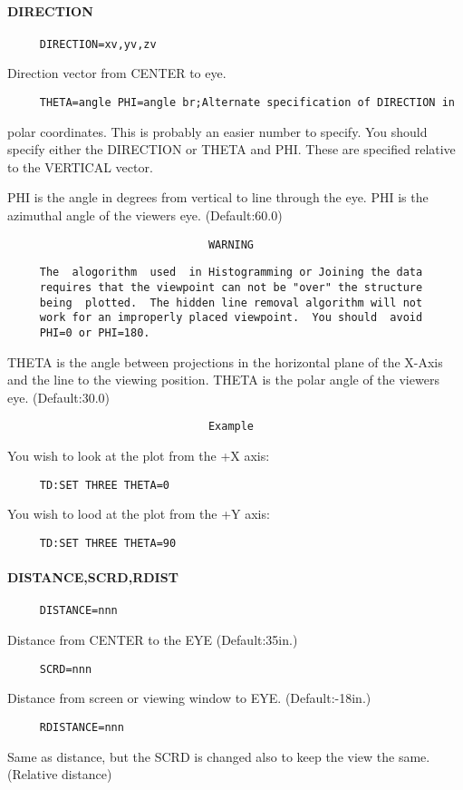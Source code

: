 \paragraph{DIRECTION}
\begin{verbatim}
     DIRECTION=xv,yv,zv 
\end{verbatim}
Direction vector from CENTER to eye.  
\begin{verbatim}
     THETA=angle PHI=angle br;Alternate specification of DIRECTION in
\end{verbatim}
polar coordinates.  This is probably an  easier  number  to  specify.
You  should specify either the DIRECTION or THETA and PHI.  These are
specified relative to the VERTICAL vector.  

PHI  is  the  angle in degrees from vertical to line through the eye.
PHI is the azimuthal angle of the viewers eye.  (Default:60.0) 


\begin{verbatim}
                               WARNING
\end{verbatim}

\begin{verbatim}
     The  alogorithm  used  in Histogramming or Joining the data
     requires that the viewpoint can not be "over" the structure
     being  plotted.  The hidden line removal algorithm will not
     work for an improperly placed viewpoint.  You should  avoid
     PHI=0 or PHI=180.  
\end{verbatim}



THETA is the angle between projections in the horizontal plane of the
X-Axis and the line to the viewing  position.   THETA  is  the  polar
angle of the viewers eye.  (Default:30.0) 

\begin{verbatim}
                               Example
\end{verbatim}
You wish to look at the plot from the +X axis:  
\begin{verbatim}
     TD:SET THREE THETA=0 
\end{verbatim}
You wish to lood at the plot from the +Y axis:  
\begin{verbatim}
     TD:SET THREE THETA=90 
\end{verbatim}
\paragraph{DISTANCE,SCRD,RDIST}
\begin{verbatim}
     DISTANCE=nnn 
\end{verbatim}
Distance from CENTER to the EYE (Default:35in.) 
\begin{verbatim}
     SCRD=nnn 
\end{verbatim}
Distance from screen or viewing window to EYE.  (Default:-18in.) 
\begin{verbatim}
     RDISTANCE=nnn 
\end{verbatim}
Same  as  distance, but the SCRD is changed also to keep the view the
same.  (Relative distance) 

